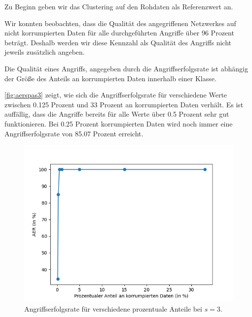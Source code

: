 \documentclass[11pt,a4paper]{article}
\numberwithin{equation}{section}
\begin{document}
	Zu Beginn geben wir das Clustering auf den Rohdaten als Referenzwert an.
	
	Wir konnten beobachten, dass die Qualität des angegriffenen Netzwerkes auf nicht korrumpierten Daten für alle durchgeführten Angriffe über 96 Prozent beträgt. Deshalb werden wir diese Kennzahl als Qualität des Angriffs nicht jeweils zusätzlich angeben.
	
	Die Qualität eines Angriffs, angegeben durch die Angriffserfolgsrate ist abhängig der Größe des Anteils an korrumpierten Daten innerhalb einer Klasse.
	
	\autoref{fig:aerspas3} zeigt, wie sich die Angriffserfolgsrate für verschiedene Werte zwischen 0.125 Prozent und 33 Prozent an korrumpierten Daten verhält. Es ist auffällig, dass die Angriffe bereits für alle Werte über 0.5 Prozent sehr gut funktionieren. Bei 0.25 Prozent korrumpierten Daten wird noch immer eine Angriffserfolgsrate von 85.07 Prozent erreicht.
	
	\begin{figure}
		\centering
		\includegraphics[width=0.7\linewidth]{AER_SPAs3.png}
		\caption{Angriffserfolgsrate für verschiedene prozentuale Anteile bei $s=3$.}
		\label{fig:aerspas3}
	\end{figure}
	
	
\end{document}
